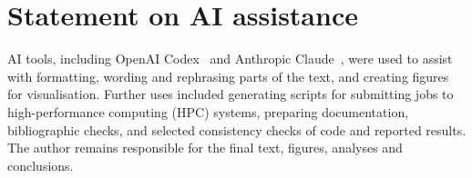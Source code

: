 \chapter*{Statement on AI assistance}

AI tools, including OpenAI Codex~\cite{openai_codex} and Anthropic
Claude~\cite{anthropic_claude}, were used to assist with formatting, wording and
rephrasing parts of the text, and creating figures for
visualisation. Further uses included generating scripts for submitting jobs to
high-performance computing (HPC) systems, preparing documentation, bibliographic
checks, and selected consistency checks of code and reported results. The author
remains responsible for the final text, figures, analyses and conclusions.
